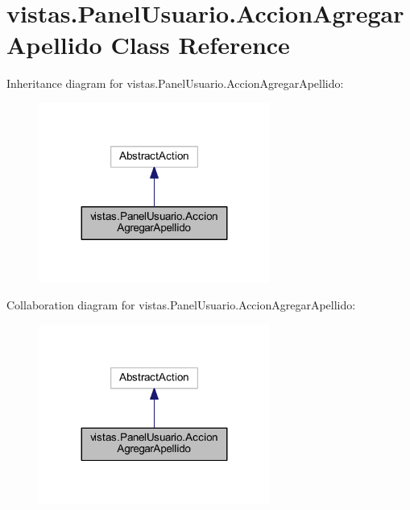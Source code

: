 \hypertarget{classvistas_1_1_panel_usuario_1_1_accion_agregar_apellido}{}\section{vistas.\+Panel\+Usuario.\+Accion\+Agregar\+Apellido Class Reference}
\label{classvistas_1_1_panel_usuario_1_1_accion_agregar_apellido}


Inheritance diagram for vistas.\+Panel\+Usuario.\+Accion\+Agregar\+Apellido\+:
\nopagebreak
\begin{figure}[H]
\begin{center}
\leavevmode
\includegraphics[width=215pt]{classvistas_1_1_panel_usuario_1_1_accion_agregar_apellido__inherit__graph}
\end{center}
\end{figure}


Collaboration diagram for vistas.\+Panel\+Usuario.\+Accion\+Agregar\+Apellido\+:
\nopagebreak
\begin{figure}[H]
\begin{center}
\leavevmode
\includegraphics[width=215pt]{classvistas_1_1_panel_usuario_1_1_accion_agregar_apellido__coll__graph}
\end{center}
\end{figure}
